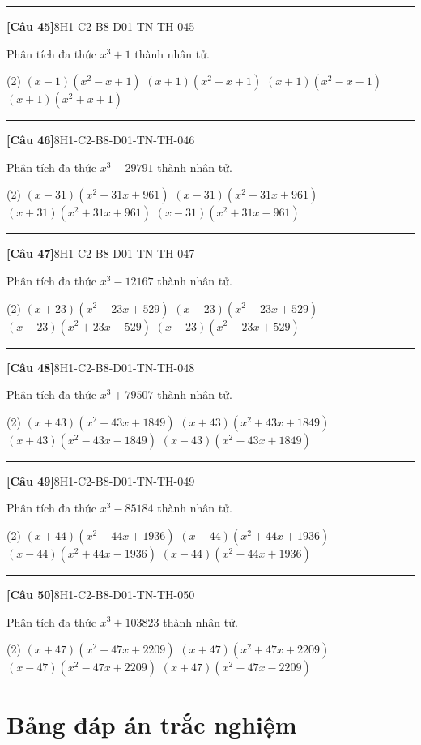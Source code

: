 \documentclass[12pt,a4paper]{article}
\newif\ifloigiai
\newenvironment{cauhoi}[2]{%
  \par\medskip\noindent\rule{\textwidth}{0.4pt}\par\nopagebreak
  \noindent\textbf{[#1]}\hfill{\scriptsize\ttfamily #2}\par\nopagebreak\smallskip}{\par}
\newcommand{\dapan}[1]{\ifloigiai\par\smallskip\noindent\textit{Đáp án:} \textbf{#1}\par\fi}
\begin{document}
\begin{cauhoi}{Câu 45}{8H1-C2-B8-D01-TN-TH-045}
Phân tích đa thức $x^{3}+1$ thành nhân tử.
\begin{tasks}(2)
\task $(x-1)(x^{2}-x+1)$
\task $(x+1)(x^{2}-x+1)$
\task $(x+1)(x^{2}-x-1)$
\task $(x+1)(x^{2}+x+1)$
\end{tasks}
\dapan{B}
\end{cauhoi}
\begin{cauhoi}{Câu 46}{8H1-C2-B8-D01-TN-TH-046}
Phân tích đa thức $x^{3}-29791$ thành nhân tử.
\begin{tasks}(2)
\task $(x-31)(x^{2}+31x+961)$
\task $(x-31)(x^{2}-31x+961)$
\task $(x+31)(x^{2}+31x+961)$
\task $(x-31)(x^{2}+31x-961)$
\end{tasks}
\dapan{A}
\end{cauhoi}
\begin{cauhoi}{Câu 47}{8H1-C2-B8-D01-TN-TH-047}
Phân tích đa thức $x^{3}-12167$ thành nhân tử.
\begin{tasks}(2)
\task $(x+23)(x^{2}+23x+529)$
\task $(x-23)(x^{2}+23x+529)$
\task $(x-23)(x^{2}+23x-529)$
\task $(x-23)(x^{2}-23x+529)$
\end{tasks}
\dapan{B}
\end{cauhoi}
\begin{cauhoi}{Câu 48}{8H1-C2-B8-D01-TN-TH-048}
Phân tích đa thức $x^{3}+79507$ thành nhân tử.
\begin{tasks}(2)
\task $(x+43)(x^{2}-43x+1849)$
\task $(x+43)(x^{2}+43x+1849)$
\task $(x+43)(x^{2}-43x-1849)$
\task $(x-43)(x^{2}-43x+1849)$
\end{tasks}
\dapan{A}
\end{cauhoi}
\begin{cauhoi}{Câu 49}{8H1-C2-B8-D01-TN-TH-049}
Phân tích đa thức $x^{3}-85184$ thành nhân tử.
\begin{tasks}(2)
\task $(x+44)(x^{2}+44x+1936)$
\task $(x-44)(x^{2}+44x+1936)$
\task $(x-44)(x^{2}+44x-1936)$
\task $(x-44)(x^{2}-44x+1936)$
\end{tasks}
\dapan{B}
\end{cauhoi}
\begin{cauhoi}{Câu 50}{8H1-C2-B8-D01-TN-TH-050}
Phân tích đa thức $x^{3}+103823$ thành nhân tử.
\begin{tasks}(2)
\task $(x+47)(x^{2}-47x+2209)$
\task $(x+47)(x^{2}+47x+2209)$
\task $(x-47)(x^{2}-47x+2209)$
\task $(x+47)(x^{2}-47x-2209)$
\end{tasks}
\dapan{A}
\end{cauhoi}
\clearpage\section*{Bảng đáp án trắc nghiệm}
\end{document}
